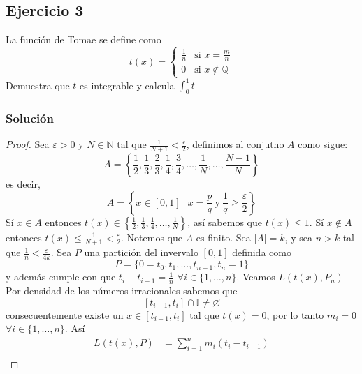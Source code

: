 \documentclass[a4paper]{article}
\begin{document}
\subsection{Ejercicio 3}
La función de Tomae se define como
\[
    t(x) =
    \begin{cases}
        \frac{1}{n} & \text{si } x = \frac{m}{n} \\
        0 & \text{si } x \notin \mathbb{Q}
    \end{cases}
\]
Demuestra que \(t\) es integrable y calcula \(\int_{0}^{1} t\)
\subsubsection*{Solución}
\begin{proof}
    Sea \(\varepsilon > 0\) y \(N \in \mathbb{N}\) tal que \(\frac{1}{N + 1} < \frac{\epsilon}{2}\),
    definimos al conjutno \(A\) como sigue:
    \[
        A = \left\{\frac{1}{2}, \frac{1}{3}, \frac{2}{3}, \frac{1}{4}, \frac{3}{4}, \dotsc, \frac{1}{N}
        , \dotsc, \frac{N - 1}{N}\right\}
    \]
    es decir, 
    \[
        A = \left\{ x \in [0, 1] \ | \ x = \frac{p}{q} \ \text{y} \ \frac{1}{q} \geq \frac{\varepsilon}{2} \right\}
    \]
    Sí \(x \in A\) entonces \(t\left(x\right) \in \left\{\frac{1}{2}, \frac{1}{3}, \frac{1}{4}
    , \dotsc, \frac{1}{N}\right\}\), así sabemos que \(t\left(x\right) \leq 1\).
    \newline
    Sí \(x \notin A\) entonces \(t\left(x\right) \leq \frac{1}{N + 1} < \frac{\varepsilon}{2}\).
    \newline 
    Notemos que \(A\) es finito. Sea \(|A| = k\), y sea \(n > k\) tal que \(\frac{1}{n} < 
    \frac{\varepsilon}{4k}\). Sea \(P\) una partición del invervalo \([0, 1]\) definida como
    \[
        P = \{0 = t_{0}, t_{1}, \dotsc, t_{n - 1}, t_{n} = 1\}    
    \]
    y además cumple con que \(t_{i} - t_{i - 1} = \frac{1}{n}\) \(\forall i \in \{1, \dotsc, n\}\).
    \newline 
    Veamos \(L\left(t(x), P_{n}\right)\)
    \newline
    Por densidad de los números irracionales sabemos que
    \[
        [t_{i - 1}, t_{i}] \cap \mathbb{I} \neq \varnothing
    \]
    consecuentemente existe un \(x \in [t_{i-1}, t_{i}]\) tal que \(t\left(x\right) = 0\), por lo tanto 
    \(m_{i} = 0\) \(\forall i \in \{1, \dotsc, n\}\). Así
    \begin{align*}
        L\left(t(x), P\right) &= \sum_{i = 1}^{n} m_{i}(t_{i} - t_{i - 1}) \\

\end{align*}
\end{proof}
\end{document}
